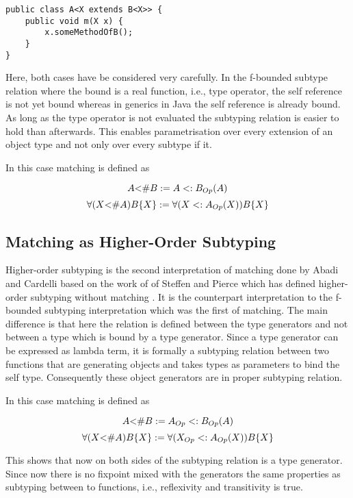 \begin{lstlisting}[float=h,caption={Universal quantified f-bound in Java},label={lst:generics}]
public class A<X extends B<X>> {
	public void m(X x) {
		x.someMethodOfB();
	}
}
\end{lstlisting}

Here, both cases have be considered very carefully. In the f-bounded subtype
relation where the bound is a real function, i.e., type operator,
the self reference is not yet bound whereas in generics in Java the self
reference is already bound. As long as the type operator is not evaluated
the subtyping relation is easier to hold than afterwards. This enables
parametrisation over every extension of an object type and not only over
every subtype if it.

In this case matching is defined as\cite{abadi_subtyping_1996}
\begin{defn}
	\label{def:matchingAsBound}
	\[A \textnormal{<\#} B := A <: B_{Op}(A)\]
	\[\forall (X \textnormal{<\#} A)B\{X\} := \forall (X <: A_{Op}(X))B\{X\}\]
\end{defn}

\subsection{Matching as Higher-Order Subtyping}
Higher-order subtyping is the second interpretation of matching done
by Abadi and Cardelli \cite{abadi_subtyping_1996} based on the work of
of Steffen and Pierce which has defined higher-order subtyping without
matching \cite{steffen_higher-order_1994}. It is the counterpart
interpretation to the f-bounded subtyping interpretation which was
the first of matching. The main difference is that here the relation is
defined between the type generators and not between a type which is bound
by a type generator. Since a type generator can be expressed as lambda
term, it is formally a subtyping relation between two functions that are
generating objects and takes types as parameters to bind the self type.
Consequently these object generators are in proper subtyping relation.

In this case matching is defined as\cite{abadi_subtyping_1996}
\begin{defn}
	\label{def:matchingAsHigherOrder}
	\[A \textnormal{<\#} B := A_{Op} <: B_{Op}(A)\]
	\[\forall (X \textnormal{<\#} A)B\{X\} := \forall (X_{Op} <: A_{Op}(X))B\{X\}\]
\end{defn}

This shows that now on both sides of the subtyping relation is a type
generator. Since now there is no fixpoint mixed with the generators
the same properties as subtyping between to functions, i.e., reflexivity
and transitivity is true.
